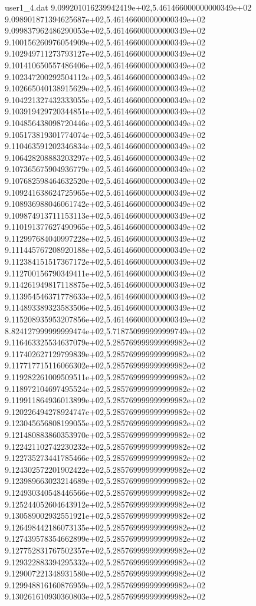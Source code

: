 \begin{filecontents}{user1_4.dat}
9.099201016239942419e+02,5.461466000000000349e+02
9.098901871394625687e+02,5.461466000000000349e+02
9.099837962486290053e+02,5.461466000000000349e+02
9.100156260976054909e+02,5.461466000000000349e+02
9.102949711273793127e+02,5.461466000000000349e+02
9.101410650557486406e+02,5.461466000000000349e+02
9.102347200292504112e+02,5.461466000000000349e+02
9.102665040138915629e+02,5.461466000000000349e+02
9.104221327432333055e+02,5.461466000000000349e+02
9.103919429720344851e+02,5.461466000000000349e+02
9.104856438098720446e+02,5.461466000000000349e+02
9.105173819301774074e+02,5.461466000000000349e+02
9.110463591202346834e+02,5.461466000000000349e+02
9.106428208883203297e+02,5.461466000000000349e+02
9.107365675904936779e+02,5.461466000000000349e+02
9.107682598464632520e+02,5.461466000000000349e+02
9.109241638624725965e+02,5.461466000000000349e+02
9.108936988046061742e+02,5.461466000000000349e+02
9.109874913711153113e+02,5.461466000000000349e+02
9.110191377627490965e+02,5.461466000000000349e+02
9.112997684040997228e+02,5.461466000000000349e+02
9.111445767208920188e+02,5.461466000000000349e+02
9.112384151517367172e+02,5.461466000000000349e+02
9.112700156790349411e+02,5.461466000000000349e+02
9.114261949817118875e+02,5.461466000000000349e+02
9.113954546371778633e+02,5.461466000000000349e+02
9.114893389323583506e+02,5.461466000000000349e+02
9.115208935953207856e+02,5.461466000000000349e+02
8.824127999999999474e+02,5.718750999999999749e+02
9.116463325534637079e+02,5.285769999999999982e+02
9.117402627129799839e+02,5.285769999999999982e+02
9.117717715116066302e+02,5.285769999999999982e+02
9.119282261009509511e+02,5.285769999999999982e+02
9.118972104697495524e+02,5.285769999999999982e+02
9.119911864936013899e+02,5.285769999999999982e+02
9.120226494278924747e+02,5.285769999999999982e+02
9.123045656808199055e+02,5.285769999999999982e+02
9.121480883860353970e+02,5.285769999999999982e+02
9.122421102742230232e+02,5.285769999999999982e+02
9.122735273441785466e+02,5.285769999999999982e+02
9.124302572201902422e+02,5.285769999999999982e+02
9.123989663023214689e+02,5.285769999999999982e+02
9.124930340548446566e+02,5.285769999999999982e+02
9.125244052604643912e+02,5.285769999999999982e+02
9.130589002932551921e+02,5.285769999999999982e+02
9.126498442186073135e+02,5.285769999999999982e+02
9.127439578354662899e+02,5.285769999999999982e+02
9.127752831767502357e+02,5.285769999999999982e+02
9.129322883394295332e+02,5.285769999999999982e+02
9.129007221348931580e+02,5.285769999999999982e+02
9.129948816160876959e+02,5.285769999999999982e+02
9.130261610930360803e+02,5.285769999999999982e+02

\end{filecontents}
